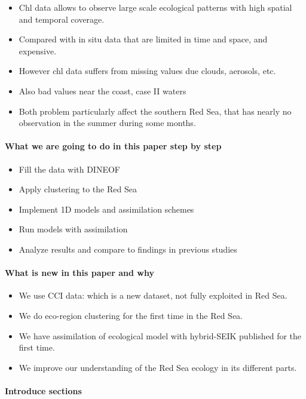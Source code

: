 \begin{itemize}
  \item Chl data allows to observe large scale ecological patterns with
high spatial and temporal coverage.
  \item Compared with in situ data that are limited in time and space,
and expensive.
  \item However chl data suffers from missing values due clouds, aerosols, etc.
  \item Also bad values near the coast, case II waters
  \item Both problem particularly affect the southern Red Sea, that has
nearly no observation in the summer during some months.
\end{itemize}

\paragraph{What we are going to do in this paper step by step}

\begin{itemize}
  \item Fill the data with DINEOF
  \item Apply clustering to the Red Sea
  \item Implement 1D models and assimilation schemes
  \item Run models with assimilation
  \item Analyze results and compare to findings in previous studies
\end{itemize}

\paragraph{What is new in this paper and why}

\begin{itemize}
  \item We use CCI data: which is a new dataset, not fully exploited in
Red Sea.
  \item We do eco-region clustering for the first time in the Red Sea.
  \item We have assimilation of ecological model with hybrid-SEIK published
for the first time.
  \item We improve our understanding of the Red Sea ecology in its different
parts.
\end{itemize}

\paragraph{Introduce sections}


